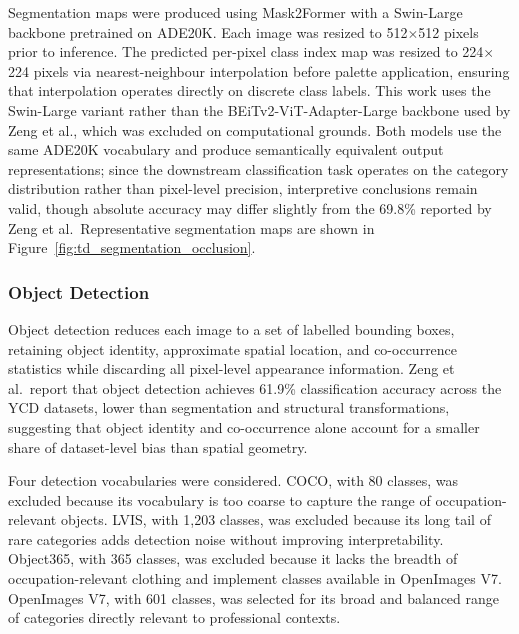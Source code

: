 Segmentation maps were produced using Mask2Former \cite{Cheng_2022_Mask2Former} with a Swin-Large backbone pretrained on ADE20K. Each image was resized to 512$\times$512 pixels prior to inference. The predicted per-pixel class index map was resized to 224$\times$224 pixels via nearest-neighbour interpolation before palette application, ensuring that interpolation operates directly on discrete class labels. This work uses the Swin-Large variant rather than the BEiTv2-ViT-Adapter-Large backbone used by Zeng et al., which was excluded on computational grounds. Both models use the same ADE20K vocabulary and produce semantically equivalent output representations; since the downstream classification task operates on the category distribution rather than pixel-level precision, interpretive conclusions remain valid, though absolute accuracy may differ slightly from the 69.8\% reported by Zeng et al.\ Representative segmentation maps are shown in Figure~\ref{fig:td_segmentation_occlusion}.

\subsubsection{Object Detection}
\label{subsec:object_detection}

Object detection reduces each image to a set of labelled bounding boxes, retaining object identity, approximate spatial location, and co-occurrence statistics while discarding all pixel-level appearance information. Zeng et al.\ report that object detection achieves 61.9\% classification accuracy across the YCD datasets, lower than segmentation and structural transformations, suggesting that object identity and co-occurrence alone account for a smaller share of dataset-level bias than spatial geometry.

Four detection vocabularies were considered. COCO, with 80 classes, was excluded because its vocabulary is too coarse to capture the range of occupation-relevant objects. LVIS, with 1,203 classes, was excluded because its long tail of rare categories adds detection noise without improving interpretability. Object365, with 365 classes, was excluded because it lacks the breadth of occupation-relevant clothing and implement classes available in OpenImages V7. OpenImages V7, with 601 classes, was selected for its broad and balanced range of categories directly relevant to professional contexts.

